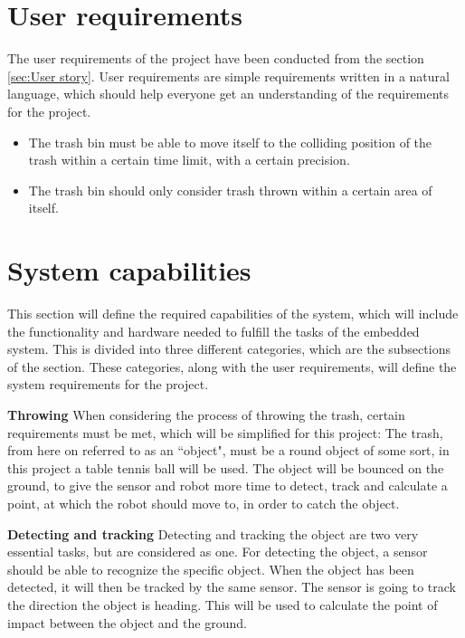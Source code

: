 \section{User requirements}
\label{sec:User requirements}
The user requirements of the project have been conducted from the section \ref{sec:User story}. User requirements are simple requirements written in a natural language, which should help everyone get an understanding of the requirements for the project.

\begin{itemize}
	\item The trash bin must be able to move itself to the colliding position of the trash within a certain time limit, with a certain precision.
	\item The trash bin should only consider trash thrown within a certain area of itself.
\end{itemize}

\section{System capabilities}
\label{sec:System capabilities}
This section will define the required capabilities of the system, which will include the functionality and hardware needed to fulfill the tasks of the embedded system. This is divided into three different categories, which are the subsections of the section. These categories, along with the user requirements, will define the system requirements for the project. 

\textbf{Throwing}\newline
When considering the process of throwing the trash, certain requirements must be met, which will be simplified for this project:
The trash, from here on referred to as an “object", must be a round object of some sort, in this project a table tennis ball will be used.  \newline
The object will be bounced on the ground, to give the sensor and robot more time to detect, track and calculate a point, at which the robot should move to, in order to catch the object.

\textbf{Detecting and tracking}\newline
Detecting and tracking the object are two very essential tasks, but are considered as one. For detecting the object, a sensor should be able to recognize the specific object. \newline
When the object has been detected, it will then be tracked by the same sensor. The sensor is going to track the direction the object is heading. This will be used to calculate the point of impact between the object and the ground.

